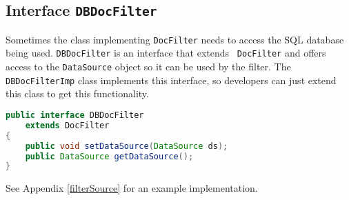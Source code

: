 \subsection{Interface {\tt DBDocFilter}}
Sometimes the class implementing {\tt DocFilter} needs to access
the SQL database being used.
{\tt DBDocFilter} is an interface that extends  {\tt
  DocFilter} and offers access to the {\tt DataSource} object so
it can be used by the filter.
The {\tt DBDocFilterImp} class implements this interface, so
developers can just extend this class to get this functionality.

\begin{lstlisting}[backgroundcolor=\color{grey},language=Java]
public interface DBDocFilter 
    extends DocFilter 
{
    public void setDataSource(DataSource ds);
    public DataSource getDataSource();
}
\end{lstlisting}

See Appendix \ref{filterSource} for an example implementation.












